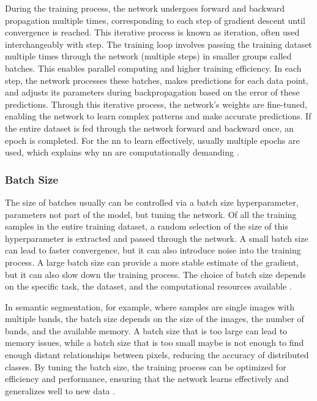 During the training process, the network undergoes forward and backward propagation multiple times, corresponding to each step of gradient descent until convergence is reached. This iterative process is known as iteration, often used interchangeably with step. The training loop involves passing the training dataset multiple times through the network (multiple steps) in smaller groups called batches. This enables parallel computing and higher training efficiency. In each step, the network processes these batches, makes predictions for each data point, and adjusts its parameters during backpropagation based on the error of these predictions. Through this iterative process, the network's weights are fine-tuned, enabling the network to learn complex patterns and make accurate predictions. If the entire dataset is fed through the network forward and backward once, an epoch is completed. For the \gls{nn} to learn effectively, usually multiple epochs are used, which explains why \gls{nn} are computationally demanding \autocite{Bernard2021,Szeliski2022,LeCun.Bottou.ea2012,Zhang.Lipton.ea2023}.

\subsubsection*{Batch Size}

The size of batches usually can be controlled via a batch size hyperparameter, parameters not part of the model, but tuning the network. Of all the training samples in the entire training dataset, a random selection of the size of this hyperparameter is extracted and passed through the network. A small batch size can lead to faster convergence, but it can also introduce noise into the training process. A large batch size can provide a more stable estimate of the gradient, but it can also slow down the training process. The choice of batch size depends on the specific task, the dataset, and the computational resources available \autocite{Bernard2021,Szeliski2022}. 

In semantic segmentation, for example, where samples are single images with multiple bands, the batch size depends on the size of the images, the number of bands, and the available memory. A batch size that is too large can lead to memory issues, while a batch size that is too small maybe is not enough to find enough distant relationships between pixels, reducing the accuracy of distributed classes. By tuning the batch size, the training process can be optimized for efficiency and performance, ensuring that the network learns effectively and generalizes well to new data \autocite{Szeliski2022,Zhang.Lipton.ea2023}.

